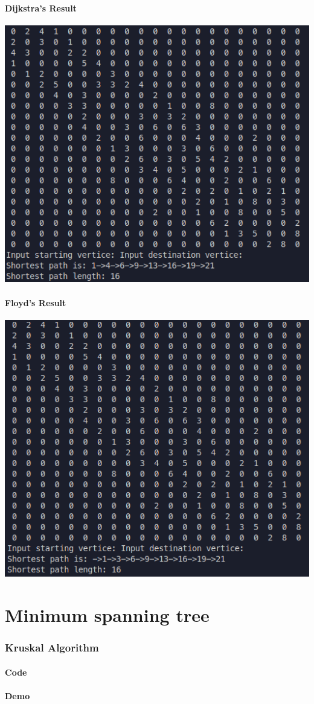 \documentclass[12pt]{article}
\begin{document}
      \subsection*{Dijkstra's Result}
        \begin{center}
          \includegraphics{../DijkstraResult.png}
        \end{center}
      \subsection*{Floyd's Result}
        \begin{center}
          \includegraphics{../FloydResult.png}
        \end{center}
  \part{Minimum spanning tree}
    \section*{Kruskal Algorithm}
      \subsection*{Code}
        
      \subsection*{Demo}
\end{document}
